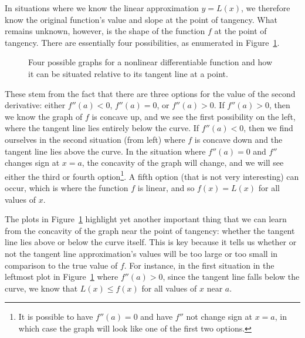 In situations where we know the linear approximation $y = L(x)$, we therefore know the original function's value and slope at the point of tangency.  What remains unknown, however, is the shape of the function $f$ at the point of tangency.  There are essentially four possibilities, as enumerated in Figure~\ref{F:1.8.Options}.  

\begin{figure}[h]
\begin{center}
\caption{Four possible graphs for a nonlinear differentiable function and how it can be situated relative to its tangent line at a point.} \label{F:1.8.Options}
\end{center}
\end{figure}

These stem from the fact that there are three options for the value of the second derivative:  either $f''(a) <0$, $f''(a) = 0$, or $f''(a) > 0$.  If $f''(a) > 0$, then we know the graph of $f$ is concave up, and we see the first possibility on the left, where the tangent line lies entirely below the curve.  If $f''(a) < 0$, then we find ourselves in the second situation (from left) where $f$ is concave down and the tangent line lies above the curve.  In the situation where $f''(a) = 0$ and $f''$ changes sign at $x = a$, the concavity of the graph will change, and we will see either the third or fourth option\footnote{It is possible to have $f''(a) = 0$ and have $f''$ not change sign at $x = a$, in which case the graph will look like one of the first two options.}.  A fifth option (that is not very interesting) can occur, which is where the function $f$ is linear, and so $f(x) = L(x)$ for all values of $x$.

The plots in Figure~\ref{F:1.8.Options} highlight yet another important thing that we can learn from the concavity of the graph near the point of tangency: whether the tangent line lies above or below the curve itself.  This is key because it tells us whether or not the tangent line approximation's values will be too large or too small in comparison to the true value of $f$.  For instance, in the first situation in the leftmost plot in Figure~\ref{F:1.8.Options} where $f''(a) > 0$, since the tangent line falls below the curve, we know that $L(x) \le f(x)$ for all values of $x$ near $a$.

